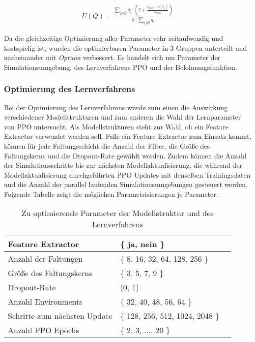 \begin{equation}
\begin{aligned}
U(Q) = \frac{\sum_{q_i \epsilon Q} q_i \cdot
    (2 + \frac{s_{max} - s(q_i)}{s_{max}})}{3 \cdot \sum_{q_i \epsilon Q} q_i}
\end{aligned}
\end{equation}

Da die gleichzeitige Optimierung aller Parameter sehr zeitaufwendig und kostspielig 
ist, wurden die optimierbaren Parameter in 3 Gruppen unterteilt und nacheinander
mit \emph{Optuna} \cite{akiba2019optuna} verbessert. Es handelt sich um Parameter
der Simulationsumgebung, des Lernverfahrens PPO und der Belohnungsfunktion.\\

\subsubsection{Optimierung des Lernverfahrens}
Bei der Optimierung des Lernverfahrens wurde zum einen die Auswirkung verschiedener
Modellstrukturen und zum anderen die Wahl der Lernparameter von PPO untersucht.
Als Modellstrukturen steht zur Wahl, ob ein Feature Extractor verwendet werden soll.
Falls ein Feature Extractor zum Einsatz kommt, können für jede Faltungsschicht
die Anzahl der Filter, die Größe des Faltungskerns und die Dropout-Rate gewählt werden.
Zudem können die Anzahl der Simulationsschritte bis zur nächsten Modellaktualisierung,
die während der Modellaktualisierung durchgeführten PPO Updates mit denselben
Trainingsdaten und die Anzahl der parallel laufenden Simulationsumgebungen gesteuert
werden. Folgende Tabelle \label{tab:OptTraining} zeigt die möglichen Parametrisierungen
je Parameter.\\

\begin{table}
  \centering
\begin{tabularx}{0.8\textwidth} { 
  | >{\raggedright\arraybackslash}X 
  | >{\centering\arraybackslash}X 
  | >{\raggedleft\arraybackslash}X | }
 \hline
 Feature Extractor & \{ ja, nein \} \\
 \hline
 Anzahl der Faltungen & \{ 8, 16, 32, 64, 128, 256 \} \\
 \hline
 Größe des Faltungskerns & \{ 3, 5, 7, 9 \} \\
 \hline
 Dropout-Rate  & (0, 1) \\
\hline
Anzahl Environments & \{ 32, 40, 48, 56, 64 \} \\
 \hline
 Schritte zum nächsten Update & \{ 128, 256, 512, 1024, 2048 \} \\
 \hline
 Anzahl PPO Epochs & \{ 2, 3, ..., 20 \} \\
 \hline
\end{tabularx}
\caption{Zu optimierende Parameter der Modellstruktur und des Lernverfahrens}
\label{tab:OptTraining}
\end{table}


